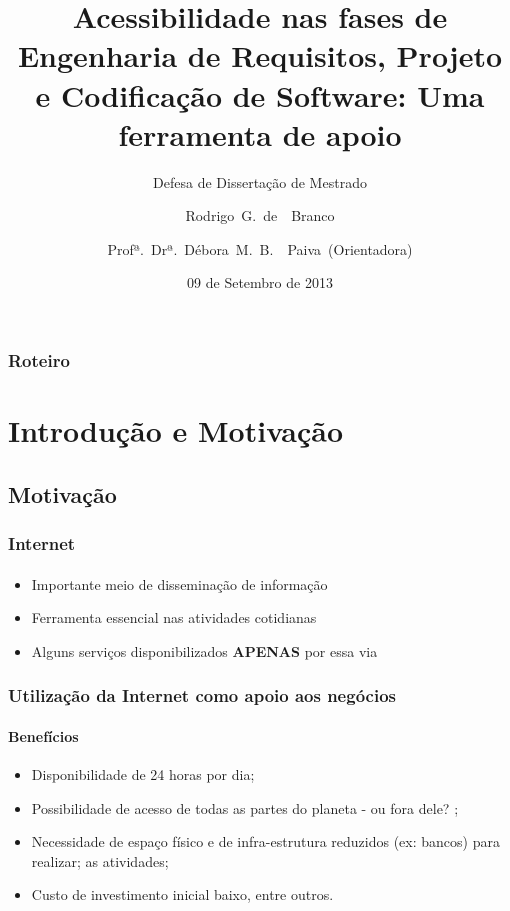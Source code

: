 \documentclass{beamer}
\title{Acessibilidade nas fases de Engenharia de Requisitos, Projeto e Codificação de Software: Uma ferramenta de apoio}
\subtitle{Defesa de Dissertação de Mestrado}
\author{\mbox{Rodrigo G. de ~Branco} \and \mbox{Profª. Drª. Débora M. B. ~Paiva (Orientadora)}}
\institute[Universities of]
{
Faculdade de Computação\\
Universidade Federal de Mato Grosso do Sul
}
\date{09 de Setembro de 2013}
\begin{document}
\begin{frame}
\titlepage
\end{frame}

\begin{frame}
\frametitle{Roteiro}
	\begin{multicols}{2}
		\tableofcontents
	\end{multicols}
\end{frame}


\section{Introdução e Motivação} 

\subsection[Motivação]{Motivação}

\begin{frame}
\frametitle{Internet}
\framesubtitle{}

\begin{itemize}
  \item Importante meio de disseminação de informação
  \item Ferramenta essencial nas atividades cotidianas
  \item Alguns serviços disponibilizados \textbf{APENAS} por essa via \citep{irpf:13,tjce:11}
\end{itemize}

\end{frame}

\begin{frame}
\frametitle{Utilização da Internet como apoio aos negócios}
\framesubtitle{Benefícios \citep{oliveira:11}}

\begin{itemize}
  \item Disponibilidade de 24 horas por dia;
  \item Possibilidade de acesso de todas as partes do planeta - ou fora dele? \citep{curiosity:13};
  \item Necessidade de espaço físico e de infra-estrutura reduzidos (ex: bancos) para realizar;
as atividades;
  \item Custo de investimento inicial baixo, entre outros.
\end{itemize}

\end{frame}
\end{document}
